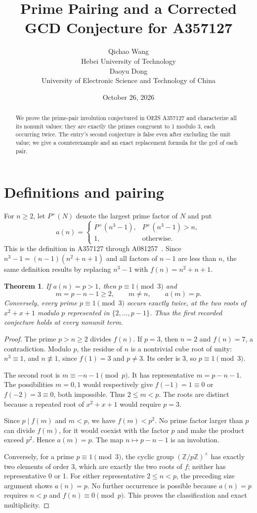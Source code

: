 \documentclass[10pt]{article}
\title{Prime Pairing and a Corrected GCD Conjecture for A357127}
\author{Qichao Wang\\{\small Hebei University of Technology}\\[0.3em]
Daoyu Dong\\{\small University of Electronic Science and Technology of China}}
\date{October 26, 2026}
\newtheorem{theorem}{Theorem}
\begin{document}
\maketitle
\begin{abstract}
We prove the prime-pair involution conjectured in OEIS A357127 and characterize all its nonunit values: they are exactly the primes congruent to 1 modulo 3, each occurring twice. The entry's second conjecture is false even after excluding the unit value; we give a counterexample and an exact replacement formula for the gcd of each pair.
\end{abstract}
\section{Definitions and pairing}
For $n\ge2$, let $P^+(N)$ denote the largest prime factor of $N$ and put
\[
 a(n)=\begin{cases}P^+(n^3-1),&P^+(n^3-1)>n,\\1,&\text{otherwise}.\end{cases}
\]
This is the definition in A357127 through A081257~\cite{oeis,source}. Since $n^3-1=(n-1)(n^2+n+1)$ and all factors of $n-1$ are less than $n$, the same definition results by replacing $n^3-1$ with $f(n)=n^2+n+1$.
\begin{theorem}
If $a(n)=p>1$, then $p\equiv1\pmod3$ and
\[
 m=p-n-1\ge2,\qquad m\ne n,\qquad a(m)=p.
\]
Conversely, every prime $p\equiv1\pmod3$ occurs exactly twice, at the two roots of $x^2+x+1$ modulo $p$ represented in $\{2,\ldots,p-1\}$. Thus the first recorded conjecture holds at every nonunit term.
\end{theorem}
\begin{proof}
The prime $p>n\ge2$ divides $f(n)$. If $p=3$, then $n=2$ and $f(n)=7$, a contradiction. Modulo $p$, the residue of $n$ is a nontrivial cube root of unity: $n^3\equiv1$, and $n\not\equiv1$, since $f(1)=3$ and $p\ne3$. Its order is 3, so $p\equiv1\pmod3$.

The second root is $m\equiv-n-1\pmod p$. It has representative $m=p-n-1$. The possibilities $m=0,1$ would respectively give $f(-1)=1\equiv0$ or $f(-2)=3\equiv0$, both impossible. Thus $2\le m<p$. The roots are distinct because a repeated root of $x^2+x+1$ would require $p=3$.

Since $p\mid f(m)$ and $m<p$, we have $f(m)<p^2$. No prime factor larger than $p$ can divide $f(m)$, for it would coexist with the factor $p$ and make the product exceed $p^2$. Hence $a(m)=p$. The map $n\mapsto p-n-1$ is an involution.

Conversely, for a prime $p\equiv1\pmod3$, the cyclic group $(\mathbb Z/p\mathbb Z)^\times$ has exactly two elements of order 3, which are exactly the two roots of $f$; neither has representative 0 or 1. For either representative $2\le n<p$, the preceding size argument shows $a(n)=p$. No further occurrence is possible because $a(n)=p$ requires $n<p$ and $f(n)\equiv0\pmod p$. This proves the classification and exact multiplicity.
\end{proof}
\end{document}
